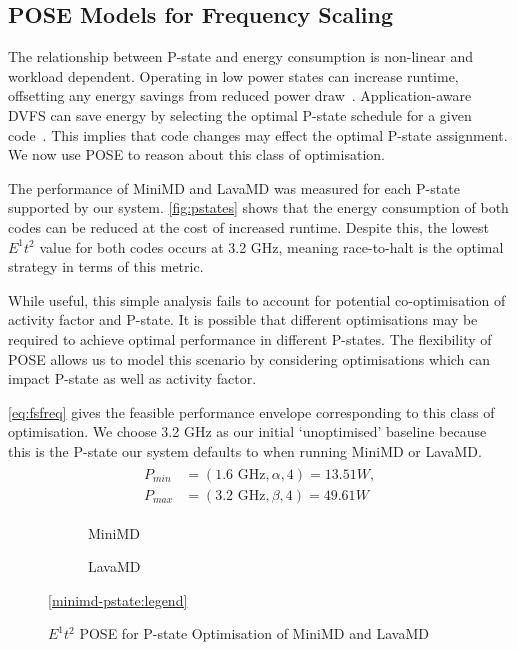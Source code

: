 \subsection{POSE Models for Frequency Scaling}
\noindent
The relationship between P-state and energy consumption is non-linear and workload dependent.
Operating in low power states can increase runtime, offsetting any energy savings from reduced power draw~\cite{le:2010aa}.
Application-aware DVFS can save energy by selecting the optimal P-state schedule for a given code~\cite{choi:2004aa}.
This implies that code changes may effect the optimal P-state assignment. 
We now use POSE to reason about this class of optimisation.

The performance of MiniMD and LavaMD was measured for each P-state supported by our system.
\autoref{fig:pstates} shows that the energy consumption of both codes can be reduced at the cost of increased runtime.
Despite this, the lowest $E^1t^2$ value for both codes occurs at 3.2 GHz, meaning race-to-halt is the optimal strategy in terms of this metric. 

While useful, this simple analysis fails to account for potential co-opti\-misa\-tion of activity factor and P-state.
It is possible that different optimisations may be required to achieve optimal performance in different P-states.
The flexibility of POSE allows us to model this scenario by considering optimisations which can impact P-state as well as activity factor.

\autoref{eq:fsfreq} gives the feasible performance envelope corresponding to this class of optimisation.
We choose 3.2 GHz as our initial `unoptimised' baseline because this is the P-state our system defaults to when running MiniMD or LavaMD.
\begin{align}
  \label{eq:fsfreq}
  \begin{split}
    P_{min} &= (1.6\text{ GHz}, \alpha, 4) = 13.51W, \\
    P_{max} &= (3.2\text{ GHz}, \beta, 4) = 49.61W
  \end{split}
\end{align}

\begin{figure*}[t]%
  \scriptsize
\begin{subfigure}[t]{.5\linewidth}%
%
\caption{MiniMD}%
\label{fig:minimd-pstates}%
\end{subfigure}%
\begin{subfigure}[t]{.5\linewidth}%
%
\caption{LavaMD}%
\label{fig:lavamd-pstates}%
\end{subfigure}%
\begin{center}%
\ref{minimd-pstate:legend}%
\end{center}%
\caption{$E^1t^2$ POSE for P-state Optimisation of MiniMD and LavaMD}%
\label{fig:pstates}%
\end{figure*}%

